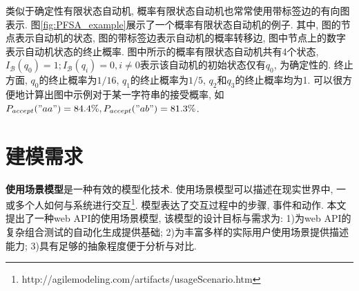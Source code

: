         类似于确定性有限状态自动机, 概率有限状态自动机也常常使用带标签边的有向图表示. 图\ref{fig:PFSA_example}展示了一个概率有限状态自动机的例子. 其中, 图的节点表示自动机的状态, 图的带标签边表示自动机的概率转移边, 图中节点上的数字表示自动机状态的终止概率. 图中所示的概率有限状态自动机共有4个状态, $I_{\mathcal{B}}(q_0)=1; I_{\mathcal{B}}(q_i) = 0, i \neq 0$表示该自动机的初始状态仅有$q_0$, 为确定性的. 终止方面, $q_0$的终止概率为$1/16$, $q_1$的终止概率为$1/5$, $q_2$和$q_3$的终止概率均为1. 可以很方便地计算出图中示例对于某一字符串的接受概率, 如$P_{accept}("aa") = 84.4\%, P_{accept}("ab") = 81.3\%$.
        
    \section{建模需求}
        \textbf{使用场景模型}是一种有效的模型化技术. 使用场景模型可以描述在现实世界中, 一或多个人如何与系统进行交互\footnote{http://agilemodeling.com/artifacts/usageScenario.htm}. 模型表达了交互过程中的步骤, 事件和动作. 本文提出了一种web API的使用场景模型, 该模型的设计目标与需求为: 1)为web API的复杂组合测试的自动化生成提供基础; 2)为丰富多样的实际用户使用场景提供描述能力; 3)具有足够的抽象程度便于分析与对比.
        

